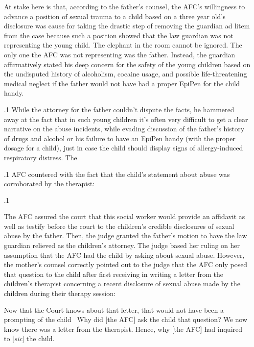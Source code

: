 \documentclass[11pt, twoside]{article}
\begin{document}
{{\nip{}%
At stake here is that, according to the father’s counsel, the AFC’s willingness to advance a position of sexual trauma to a child based on a
three year old’s disclosure was cause for taking the drastic step of removing the guardian ad litem from the case because such a position showed
that the law guardian was not  representing the young child.
The elephant in the room cannot be ignored. The only one the AFC was
not representing  was the father. Instead, the guardian affirmatively stated his deep concern for the safety of the young children
based on the undisputed history of alcoholism, cocaine usage, and possible life-threatening medical neglect if the father would not have had a
proper EpiPen for the child handy.
}%

\p.1{%
While the attorney for the father couldn’t dispute the facts, he hammered away at the fact that in such young children it’s often very difficult
to get a clear narrative on the abuse incidents, while evading discussion of the father’s history of drugs and alcohol or his failure to have
an EpiPen handy (with the proper dosage for a child), just in case the
child should display signs of allergy-induced respiratory distress. The
}%

\p.1{%
AFC countered with the fact that the child’s statement about abuse was
corroborated by the therapist: 
}%

\p.1{%
The AFC assured the court that this social worker would provide
an affidavit as well as testify before the court to the children’s
credible disclosures of sexual abuse by the father. Then, the judge
granted the father’s motion to have the law guardian relieved as the
children’s attorney. The judge based her ruling on her assumption
that the AFC had  the child by asking about sexual abuse.
However, the mother’s counsel correctly pointed out to the judge that
the AFC only posed that question to the child after first receiving in
writing a letter from the children’s therapist concerning a recent disclosure of sexual abuse made by the children during their therapy
session:

\begin{blockQuote}
Now that the Court knows about that letter, that would not have
been a prompting of the child \ellThree{2pt}{2pt}\ Why did [the AFC] ask the child
that question? We now know there was a letter from the therapist.
Hence, why [the AFC] had inquired to [\textit{sic}] the child.
\end{blockQuote}

}}
\end{document}
